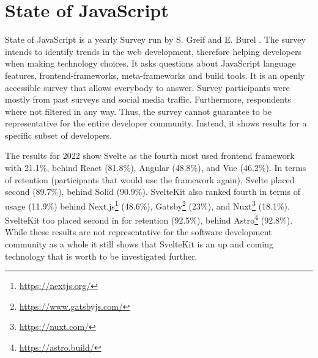 
\section{State of JavaScript}
\label{sec:state-of-js}
State of JavaScript is a yearly Survey run by S. Greif and E. Burel \cite{greif_state_2022}. The survey intends to identify trends in the web development, therefore helping developers when making technology choices. It asks questions about JavaScript language features, frontend-frameworks, meta-frameworks and build tools. It is an openly accessible survey that allows everybody to answer. Survey participants were mostly from past surveys and social media traffic. Furthermore, respondents where not filtered in any way. Thus, the survey cannot guarantee to be representative for the entire developer community. Instead, it shows results for a specific subset of developers.

The results for 2022 show Svelte as the fourth most used frontend framework with 21.1\%, behind React (81.8\%), Angular (48.8\%), and Vue (46.2\%). In terms of retention (participants that would use the framework again), Svelte placed second (89.7\%), behind Solid (90.9\%). SvelteKit also ranked fourth in terms of usage (11.9\%) behind Next.js\footnote{\url{https://nextjs.org/}} (48.6\%), Gatsby\footnote{\url{https://www.gatsbyjs.com/}} (23\%), and Nuxt\footnote{\url{https://nuxt.com/}} (18.1\%). SvelteKit too placed second in for retention (92.5\%), behind Astro\footnote{\url{https://astro.build/}} (92.8\%). While these results are not representative for the software development community as a whole it still shows that SvelteKit is an up and coming technology that is worth to be investigated further.